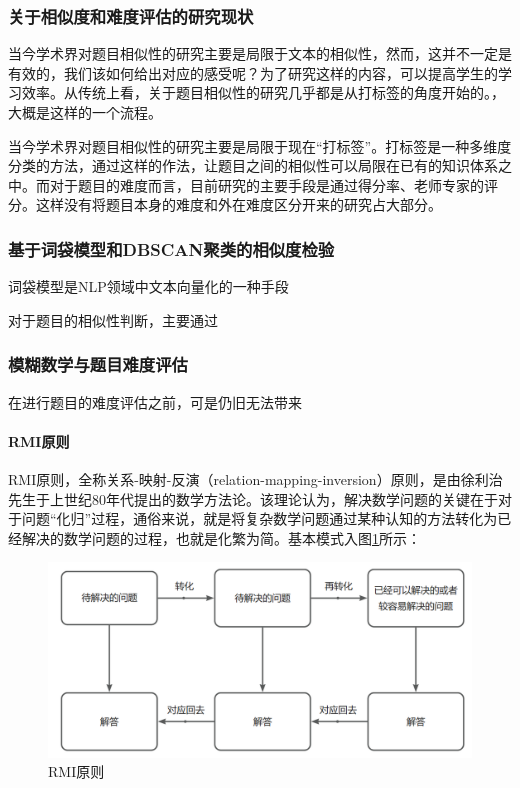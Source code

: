 \subsubsection{关于相似度和难度评估的研究现状}

当今学术界对题目相似性的研究主要是局限于文本的相似性，然而，这并不一定是有效的，我们该如何给出对应的感受呢？为了研究这样的内容，可以提高学生的学习效率。从传统上看，关于题目相似性的研究几乎都是从打标签的角度开始的。\cite{xuTimunandupinggufangfayanjiuzongshu2022}，大概是这样的一个流程。

当今学术界对题目相似性的研究主要是局限于现在“打标签”。打标签是一种多维度分类的方法，通过这样的作法，让题目之间的相似性可以局限在已有的知识体系之中。而对于题目的难度而言，目前研究的主要手段是通过得分率、老师专家的评分。这样没有将题目本身的难度和外在难度区分开来的研究占大部分。

\subsubsection{基于词袋模型和DBSCAN聚类的相似度检验}

词袋模型是NLP领域中文本向量化的一种手段

对于题目的相似性判断，主要通过

\subsubsection{模糊数学与题目难度评估}

在进行题目的难度评估之前，可是仍旧无法带来

\paragraph{RMI原则}

RMI原则，全称关系-映射-反演（relation-mapping-inversion）原则，是由徐利治先生于上世纪80年代提出的数学方法论\cite{zhangShuxueshitishiqiannandudeyingxiangyinsujiqilianghuayanjiu2022}。该理论认为，解决数学问题的关键在于对于问题“化归”过程，通俗来说，就是将复杂数学问题通过某种认知的方法转化为已经解决的数学问题的过程，也就是化繁为简。基本模式入图\ref{figure040117}所示：

\begin{figure}[h]
    \centering
    \includegraphics[scale=0.3]{res/figure040117.png}
    \caption{RMI原则}
    \label{figure040117}
\end{figure}

